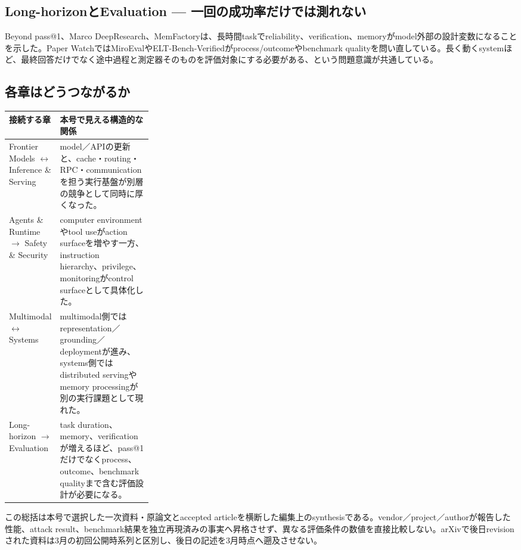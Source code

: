 \begin{multicols}{2}
\subsection{Long-horizonとEvaluation — 一回の成功率だけでは測れない}
Beyond pass@1、Marco DeepResearch、MemFactoryは、長時間taskでreliability、verification、memoryがmodel外部の設計変数になることを示した。Paper WatchではMiroEvalやELT-Bench-Verifiedがprocess/outcomeやbenchmark qualityを問い直している。長く動くsystemほど、最終回答だけでなく途中過程と測定器そのものを評価対象にする必要がある、という問題意識が共通している。 \cite{src-0ec537ec1cc1,src-2b8b39e5cae3,src-42318ebdee75,src-5d84874f2d03,src-a27679e5527b}

\end{multicols}
\Needspace{0.34\textheight}
\subsection*{各章はどうつながるか}
\begin{center}
\small
\renewcommand{\arraystretch}{1.16}
\begin{tabularx}{\linewidth}{@{}p{0.28\linewidth}X@{}}
\toprule
接続する章 & 本号で見える構造的な関係 \\
\midrule
Frontier Models $\leftrightarrow$ Inference \& Serving & model／APIの更新と、cache・routing・RPC・communicationを担う実行基盤が別層の競争として同時に厚くなった。 \cite{src-eea6230f612a,src-7e670bf82538,src-d6cda62f02bb} \\
Agents \& Runtime $\rightarrow$ Safety \& Security & computer environmentやtool useがaction surfaceを増やす一方、instruction hierarchy、privilege、monitoringがcontrol surfaceとして具体化した。 \cite{src-01572b4c34e9,src-18b7ee4fe5e4,src-5becf449a527} \\
Multimodal $\leftrightarrow$ Systems & multimodal側ではrepresentation／grounding／deploymentが進み、systems側ではdistributed servingやmemory processingが別の実行課題として現れた。 \cite{src-ac36472a8f09,src-361b6111931d,src-b6e517afaa35} \\
Long-horizon $\rightarrow$ Evaluation & task duration、memory、verificationが増えるほど、pass@1だけでなくprocess、outcome、benchmark qualityまで含む評価設計が必要になる。 \cite{src-0ec537ec1cc1,src-5d84874f2d03,src-a27679e5527b} \\
\bottomrule
\end{tabularx}
\renewcommand{\arraystretch}{1.0}
\end{center}
\normalsize
\begin{claimboundary}[この総括の境界]
この総括は本号で選択した一次資料・原論文とaccepted articleを横断した編集上のsynthesisである。vendor／project／authorが報告した性能、attack result、benchmark結果を独立再現済みの事実へ昇格させず、異なる評価条件の数値を直接比較しない。arXivで後日revisionされた資料は3月の初回公開時系列と区別し、後日の記述を3月時点へ遡及させない。
\end{claimboundary}
